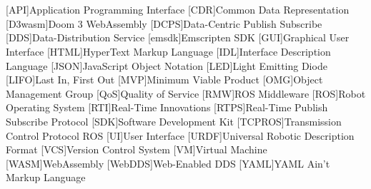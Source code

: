 \chapter*{}



\section*{}
\begin{acronym}[LONGEST]

    [API]{Application Programming Interface}
    [CDR]{Common Data Representation}
    [D3wasm]{Doom 3 WebAssembly}
    [DCPS]{Data-Centric Publish Subscribe}
    [DDS]{Data-Distribution Service}
    [emsdk]{Emscripten SDK}
    [GUI]{Graphical User Interface}
    [HTML]{HyperText Markup Language}
    [IDL]{Interface Description Language}
    [JSON]{JavaScript Object Notation}
    [LED]{Light Emitting Diode}
    [LIFO]{Last In, First Out}
    [MVP]{Minimum Viable Product}
    [OMG]{Object Management Group}
    [QoS]{Quality of Service}
    [RMW]{ROS Middleware}
    [ROS]{Robot Operating System}
    [RTI]{Real-Time Innovations}
    [RTPS]{Real-Time Publish Subscribe Protocol}
    [SDK]{Software Development Kit}
    [TCPROS]{Transmission Control Protocol ROS}
    [UI]{User Interface}
    [URDF]{Universal Robotic Description Format}
    [VCS]{Version Control System}
    [VM]{Virtual Machine}
    [WASM]{WebAssembly}
    [WebDDS]{Web-Enabled DDS}
    [YAML]{YAML Ain't Markup Language}

\end{acronym}

